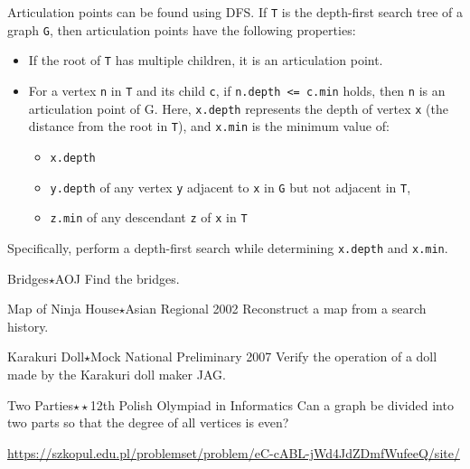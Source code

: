 Articulation points can be found using DFS. If \texttt{T} is the depth-first search tree of a graph \texttt{G}, then articulation points have the following properties:
\begin{itemize}
  \item If the root of \texttt{T} has multiple children, it is an articulation point.
  \item For a vertex \texttt{n} in \texttt{T} and its child \texttt{c}, if \texttt{n.depth <= c.min} holds, then \texttt{n} is an articulation point of G. Here, \texttt{x.depth} represents the depth of vertex \texttt{x} (the distance from the root in \texttt{T}), and \texttt{x.min} is the minimum value of:
    \begin{itemize}
    \item \texttt{x.depth}
    \item \texttt{y.depth} of any vertex \texttt{y} adjacent to \texttt{x} in \texttt{G} but not adjacent in \texttt{T},
    \item \texttt{z.min} of any descendant \texttt{z} of \texttt{x} in \texttt{T}
    \end{itemize}
\end{itemize}
Specifically, perform a depth-first search while determining \texttt{x.depth} and \texttt{x.min}.

\begin{pbox}{Bridges$\star$}{AOJ}
Find the bridges.

\end{pbox}

\begin{pbox}{Map of Ninja House$\star$}{Asian Regional 2002}
Reconstruct a map from a search history.

\end{pbox}

\begin{pbox}{Karakuri Doll$\star$}{Mock National Preliminary 2007}
Verify the operation of a doll made by the Karakuri doll maker JAG.

\end{pbox}

\begin{pbox}{Two Parties$\star\star$}{12th Polish Olympiad in Informatics}
Can a graph be divided into two parts so that the degree of all vertices is even?

\url{https://szkopul.edu.pl/problemset/problem/eC-cABL-jWd4JdZDmfWufeeQ/site/}
\end{pbox}

